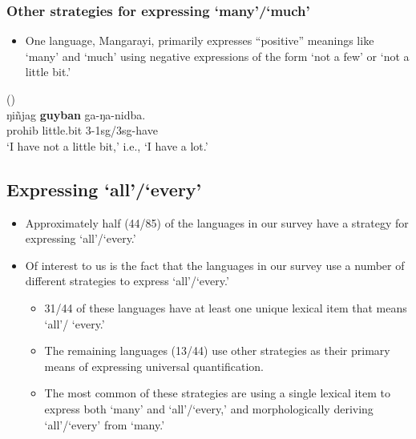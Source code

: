 \documentclass{article}
\makeatletter
\newcommand{\ofy}{/85} %
\makeatother
\begin{document}
\subsubsection{Other strategies for expressing `many'/`much'}

\begin{itemize}
\item One language, Mangarayi, primarily expresses ``positive'' meanings like `many' and `much' using negative expressions of the form `not a few' or `not a little bit.'
\end{itemize}

\begin{exe}
   (\citealt[37-38]{merlan89}) \\
  \gll ŋi\~{n}jag \textbf{guyban} ga-ŋa-nidba.\\
  {\sc prohib} little.bit 3-1{\sc sg}/3{\sc sg}-have\\
  \glt `I have not a little bit,' i.e., `I have a lot.'
\end{exe}


\subsection{Expressing `all'/`every'}

\begin{itemize}
\item Approximately half (44\ofy) of the languages in our survey have a strategy for expressing `all'/`every.'
\item Of interest to us is the fact that the languages in our survey use a number of different strategies to express `all'/`every.'
  \begin{itemize}
  \item 31/44 of these languages have at least one unique lexical item that means `all'/ `every.'
  \item The remaining languages (13/44) use other strategies as their primary means of expressing universal quantification.
    
  \item The most common of these strategies are using a single lexical item to express both `many' and `all'/`every,' and morphologically deriving `all'/`every' from `many.'
  \end{itemize}
\end{itemize}
\end{document}
